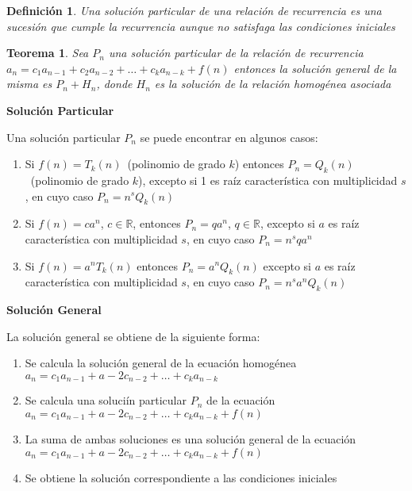 \documentclass[a4paper,12pt]{report}
\newtheorem*{teo}{Teorema}
\newtheorem*{dfn}{Definición}
\begin{document}
\begin{dfn}
 Una solución particular de una relación de recurrencia es una sucesión que cumple la recurrencia aunque no satisfaga las condiciones iniciales
\end{dfn}

\begin{teo}
 Sea $P_n$ una solución particular de la relación de recurrencia\\ 
 $a_n=c_1a_{n-1}+c_2a_{n-2}+\dots+c_ka_{n-k}+f(n)$ entonces la solución general de la misma es
 $P_n+H_n$, donde $H_n$ es la solución de la relación homogénea asociada
\end{teo}

\textbf{Solución Particular}

Una solución particular $P_n$ se puede encontrar en algunos casos:

\begin{enumerate}
 \item Si $f(n)=T_k(n)$~(polinomio de grado $k$) entonces $P_n=Q_k(n)$~(polinomio de grado $k$), excepto si 1 es raíz característica con multiplicidad $s$, en cuyo caso $P_n=n^sQ_k(n)$
 \item Si $f(n)=ca^n$, $c\in\mathbb{R}$, entonces $P_n=qa^n$, $q\in\mathbb{R}$, excepto si $a$ es raíz característica con multiplicidad $s$, en cuyo caso $P_n=n^sqa^n$
 \item Si $f(n)=a^nT_k(n)$ entonces $P_n=a^nQ_k(n)$ excepto si $a$ es raíz característica con multiplicidad $s$, en cuyo caso $P_n=n^sa^nQ_k(n)$

\end{enumerate}


\textbf{Solución General}

La solución general se obtiene de la siguiente forma:

\begin{enumerate}
 \item Se calcula la solución general de la ecuación homogénea\\ 
 $a_n=c_1a_{n-1}+a-2c_{n-2}+\dots+c_ka_{n-k}$ 
 \item Se calcula una soluciín particular $P_n$ de la ecuación\\ 
 $a_n=c_1a_{n-1}+a-2c_{n-2}+\dots+c_ka_{n-k}+f(n)$ 
 \item La suma de ambas soluciones es una solución general de la ecuación\\
 $a_n=c_1a_{n-1}+a-2c_{n-2}+\dots+c_ka_{n-k}+f(n)$ 
 \item Se obtiene la solución correspondiente a las condiciones iniciales
 \end{enumerate}
 
\end{document}
